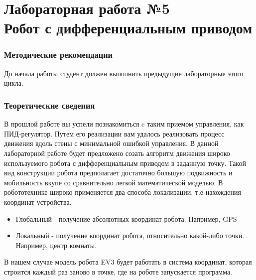 \documentclass[12pt,a4paper,openany]{extarticle}
\begin{document}
\part*{Лабораторная работа №5\\
Робот с дифференциальным приводом}

\section{Методические рекомендации}
\hspace*{\parindent}До начала работы студент должен выполнить предыдущие лабораторные этого цикла.

\section{Теоретические сведения}
\hspace*{\parindent}В прошлой работе вы успели познакомиться c таким приемом управления, как ПИД-регулятор. Путем его реализации вам удалось реализовать процесс движения вдоль стены с минимальной ошибкой управления. В данной лабораторной работе будет предложено созать алгоритм движения широко используемого робота с дифференциальным приводом в заданную точку. Такой вид конструкции робота предполагает достаточно большую подвижность и мобильность вкупе со сравнительно легкой математической моделью. В робототехнике широко применяется два способа локализации, т.е нахождения координат устройства.

\begin{itemize}  
\item Глобальный - получение абсолютных координат робота. Например, GPS 
\item Локальный - получение координат робота, относительно какой-либо точки. Например, центр комнаты.
\end{itemize}

В нашем случае модель робота EV3 будет работать в система координат, которая строится каждый раз заново в точке, где на роботе запускается программа. 
\end{document}
